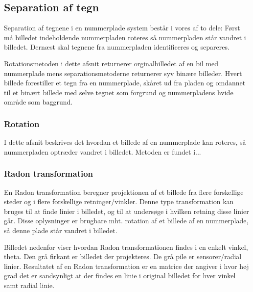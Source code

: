 \subsection{Separation af tegn}

Separation af tegnene i en nummerplade system består i vores af to dele: Først må billedet indeholdende nummerpladen roteres så nummerpladen står vandret i billedet. Dernæst skal tegnene fra nummerpladen identificeres og separeres.


Rotationsmetoden i dette afsnit returnerer orginalbilledet af en bil med nummerplade mens separationsmetoderne returnerer syv binære billeder. Hvert billede forestiller et tegn fra en nummerplade, skåret ud fra pladen og omdannet til et binært billede med selve tegnet som forgrund og nummerpladens hvide område som baggrund.


\subsubsection{Rotation}
I dette afsnit beskrives det hvordan et billede af en nummerplade kan roteres, så nummerpladen optræder vandret i billedet. Metoden er fundet i...


\subsubsection*{Radon transformation}
En Radon transformation beregner projektionen af et billede fra flere forskellige steder og i flere forskellige retninger/vinkler. Denne type transformation kan bruges til at finde linier i billedet, og til at undersøge i hvilken retning disse linier går. Disse oplysninger er brugbare mht. rotation af et billede af en nummerplade, så denne plade står vandret i billedet.

Billedet nedenfor viser hvordan Radon transformationen findes i en enkelt vinkel, theta. Den grå firkant er billedet der projekteres. De grå pile er sensorer/radial linier. Resultatet af en Radon transformation er en matrice der angiver i hvor høj grad det er sandsynligt at der findes en linie i original billedet for hver vinkel samt radial linie.


